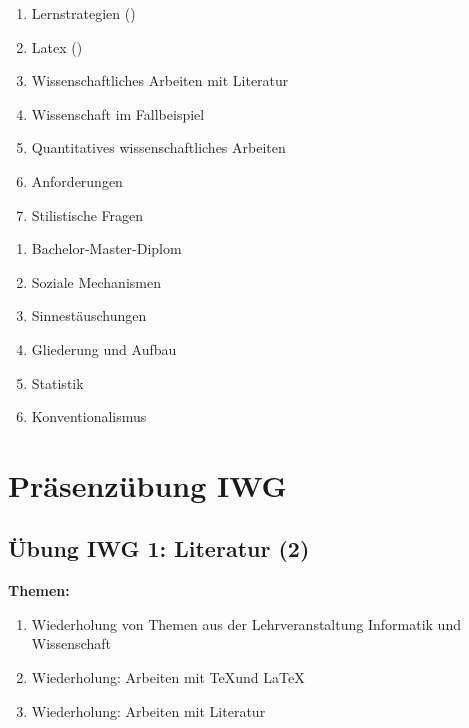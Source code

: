 

















\begin{enumerate}
\item Lernstrategien ()
\item Latex ()
\item Wissenschaftliches Arbeiten mit Literatur
\item Wissenschaft im Fallbeispiel
\item Quantitatives wissenschaftliches Arbeiten
\item Anforderungen
\item Stilistische Fragen
\end{enumerate}



\begin{enumerate}
\item Bachelor-Master-Diplom
\item Soziale Mechanismen
\item Sinnestäuschungen
\item Gliederung und Aufbau 
\item Statistik
\item Konventionalismus
\end{enumerate}



\section{Präsenzübung IWG}


\subsection{Übung IWG 1: Literatur (2)}

\textbf{Themen:}
\begin{enumerate}
\item Wiederholung von Themen aus der Lehrveranstaltung Informatik und Wissenschaft
\item Wiederholung: Arbeiten mit \TeX und \LaTeX
\item Wiederholung: Arbeiten mit Literatur
\end{enumerate}

